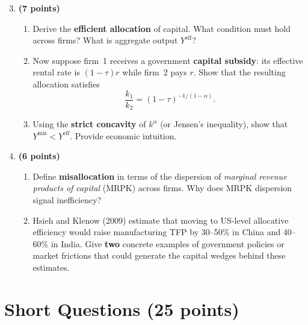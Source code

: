 \documentclass[a4paper,11pt]{article}
\begin{document}
\begin{enumerate}[label=\textbf{\arabic*.}, leftmargin=*, itemsep=6pt]
    \setcounter{enumi}{2}

    \item \textbf{(7 points)}
    \begin{enumerate}[label=(\alph*), itemsep=4pt]
        \item Derive the \textbf{efficient allocation} of capital.  What condition must
        hold across firms?  What is aggregate output $Y^{\mathrm{eff}}$?
        \item Now suppose firm~1 receives a government \textbf{capital subsidy}: its
        effective rental rate is $(1-\tau)r$ while firm~2 pays $r$.  Show that the
        resulting allocation satisfies
        \[
            \frac{k_1}{k_2} = (1-\tau)^{-1/(1-\alpha)}.
        \]
        \item Using the \textbf{strict concavity} of $k^{\alpha}$ (or Jensen's inequality),
        show that $Y^{\mathrm{mis}} < Y^{\mathrm{eff}}$.  Provide economic intuition.
    \end{enumerate}

    \item \textbf{(6 points)}
    \begin{enumerate}[label=(\alph*), itemsep=4pt]
        \item Define \textbf{misallocation} in terms of the dispersion of
        \emph{marginal revenue products of capital} (MRPK) across firms.
        Why does MRPK dispersion signal inefficiency?
        \item Hsieh and Klenow (2009) estimate that moving to US-level allocative
        efficiency would raise manufacturing TFP by 30--50\% in China and 40--60\% in
        India.  Give \textbf{two} concrete examples of government policies or market
        frictions that could generate the capital wedges behind these estimates.
    \end{enumerate}

\end{enumerate}

\clearpage

\section{Short Questions \hfill (25 points)}
\end{document}

